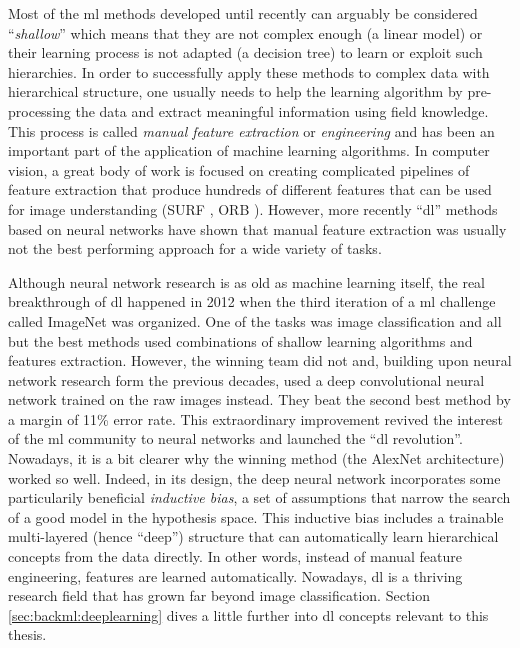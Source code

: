 Most of the \acrlong{ml} methods developed until recently can arguably be considered ``\textit{shallow}'' which means that they are not complex enough (\eg a linear model) or their learning process is not adapted (\eg a decision tree) to learn or exploit such hierarchies. In order to successfully apply these methods to complex data with hierarchical structure, one usually needs to help the learning algorithm by pre-processing the data and extract meaningful information using field knowledge. This process is called \textit{manual feature extraction} or \textit{engineering} and has been an important part of the application of machine learning algorithms. In computer vision, a great body of work is focused on creating complicated pipelines of feature extraction that produce hundreds of different features that can be used for image understanding (\eg SURF \parencite{bay2006surf}, ORB \parencite{rublee2011orb}). However, more recently ``\acrlong{dl}'' methods based on neural networks have shown that manual feature extraction was usually not the best performing approach for a wide variety of tasks.

Although neural network research is as old as machine learning itself, the real breakthrough of \acrlong{dl} happened in 2012 when the third iteration of a \acrlong{ml} challenge called ImageNet \parencite{russakovsky2015imagenet} was organized. One of the tasks was image classification and all but the best methods used combinations of shallow learning algorithms and features extraction. However, the winning team did not and, building upon neural network research form the previous decades, used a deep convolutional neural network \parencite{krizhevsky2012imagenet} trained on the raw images instead. They beat the second best method by a margin of 11\% error rate. This extraordinary improvement revived the interest of the \acrlong{ml} community to neural networks and launched the ``\acrlong{dl} revolution''. Nowadays, it is a bit clearer why the winning method (\ie the AlexNet architecture) worked so well. Indeed, in its design, the deep neural network incorporates some particularily beneficial \textit{inductive bias}, a set of assumptions that narrow the search of a good model in the hypothesis space. This inductive bias includes a trainable multi-layered (hence ``deep'') structure that can automatically learn hierarchical concepts from the data directly. In other words, instead of manual feature engineering, features are learned automatically. Nowadays, \acrlong{dl} is a thriving research field that has grown far beyond image classification. Section \ref{sec:backml:deeplearning} dives a little further into \acrlong{dl} concepts relevant to this thesis.

